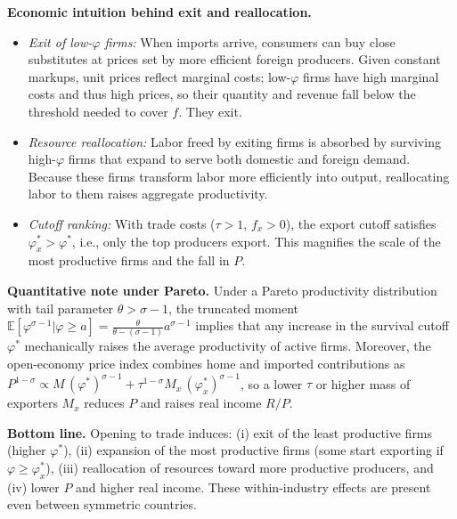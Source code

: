 \begin{solution}
\bigskip
	\textbf{Economic intuition behind exit and reallocation.}
\begin{itemize}
	\item \emph{Exit of low-$\varphi$ firms:} When imports arrive, consumers can buy close substitutes at prices set by more efficient foreign producers. Given constant markups, unit prices reflect marginal costs; low-$\varphi$ firms have high marginal costs and thus high prices, so their quantity and revenue fall below the threshold needed to cover $f$. They exit.
	\item \emph{Resource reallocation:} Labor freed by exiting firms is absorbed by surviving high-$\varphi$ firms that expand to serve both domestic and foreign demand. Because these firms transform labor more efficiently into output, reallocating labor to them raises aggregate productivity.
	\item \emph{Cutoff ranking:} With trade costs ($\tau>1$, $f_x>0$), the export cutoff satisfies $\varphi_x^*>\varphi^*$, i.e., only the top producers export. This magnifies the scale of the most productive firms and the fall in $P$.
\end{itemize}

\bigskip
		\textbf{Quantitative note under Pareto.}
Under a Pareto productivity distribution with tail parameter $\theta>\sigma-1$, the truncated moment $\mathbb{E}[\varphi^{\sigma-1}|\varphi\ge a]=\tfrac{\theta}{\theta-(\sigma-1)}a^{\sigma-1}$ implies that any increase in the survival cutoff $\varphi^*$ mechanically raises the average productivity of active firms. Moreover, the open-economy price index combines home and imported contributions as $P^{1-\sigma}\propto M\, (\varphi^*)^{\sigma-1} + \tau^{1-\sigma} M_x\, (\varphi_x^*)^{\sigma-1}$, so a lower $\tau$ or higher mass of exporters $M_x$ reduces $P$ and raises real income $R/P$.

\bigskip
	\textbf{Bottom line.}
Opening to trade induces: (i) exit of the least productive firms (higher $\varphi^*$), (ii) expansion of the most productive firms (some start exporting if $\varphi\ge\varphi_x^*$), (iii) reallocation of resources toward more productive producers, and (iv) lower $P$ and higher real income. These within-industry effects are present even between symmetric countries.

\medskip
\noindent{}
\end{solution}
